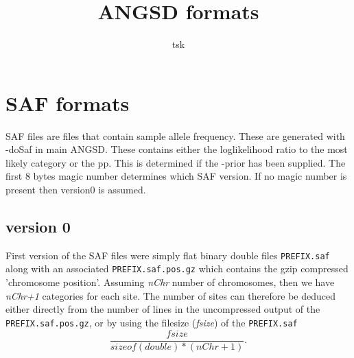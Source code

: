 \documentclass[10pt]{article}
\begin{document}
\title{ANGSD formats}
\author{tsk}
\maketitle
\vspace*{1em}


\section{SAF formats}
SAF files are files that contain sample allele frequency. These are generated with -doSaf in main ANGSD. These contains either the loglikelihood ratio to the most likely category or the pp. This is determined if the -prior has been supplied.
The first 8 bytes magic number determines which SAF version. If no magic number is present then version0 is assumed.
\subsection{version 0}
First version of the SAF files were simply flat binary double files \texttt{PREFIX.saf} along with an associated \texttt{PREFIX.saf.pos.gz} which contains the gzip compressed 'chromosome position'. Assuming \emph{nChr} number of chromosomes, then we have \emph{nChr+1} categories for each site. The number of sites can therefore be deduced either directly from the number of lines in the uncompressed output of the \texttt{PREFIX.saf.pos.gz}, or by using the filesize (\emph{fsize}) of the \texttt{PREFIX.saf} $$\frac{fsize}{sizeof(double)*(nChr+1)}.$$
\end{document}
